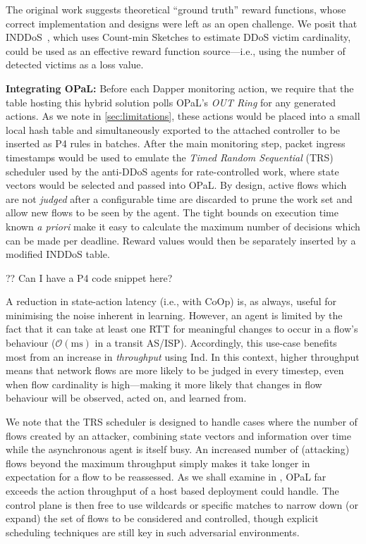 \documentclass[sigconf,natbib=false]{acmart}
\newcommand{\fakepara}[1]{\noindent\textbf{#1:}}
\newcommand{\approachshort}{OPaL}
\newcommand{\Coopfw}{CoOp}
\newcommand{\Indfw}{Ind}
\begin{document}
The original work suggests theoretical ``ground truth'' reward functions, whose correct implementation and designs were left as an open challenge. 
We posit that INDDoS~\parencite{tnms-ddos-victim-ident}, which uses Count-min Sketches to estimate DDoS victim cardinality, could be used as an effective reward function source---i.e., using the number of detected victims as a loss value.

\fakepara{Integrating \approachshort}
Before each Dapper monitoring action, we require that the table hosting this hybrid solution polls \approachshort{}'s \emph{OUT Ring} for any generated actions.
As we note in \cref{sec:limitations}, these actions would be placed into a small local hash table and simultaneously exported to the attached controller to be inserted as P4 rules in batches.
After the main monitoring step, packet ingress timestamps would be used to emulate the \emph{Timed Random Sequential} (TRS) scheduler used by the anti-DDoS agents for rate-controlled work, where state vectors would be selected and passed into \approachshort.
By design, active flows which are not \emph{judged} after a configurable time are discarded to prune the work set and allow new flows to be seen by the agent.
The tight bounds on execution time known \emph{a priori} make it easy to calculate the maximum number of decisions which can be made per deadline.
Reward values would then be separately inserted by a modified INDDoS table.

?? Can I have a P4 code snippet here?

A reduction in state-action latency (i.e., with \Coopfw) is, as always, useful for minimising the noise inherent in learning.
However, an agent is limited by the fact that it can take at least one RTT for meaningful changes to occur in a flow's behaviour ($\mathcal{O}{\left(\si{\milli\second}\right)}$ in a transit AS/ISP).
Accordingly, this use-case benefits most from an increase in \emph{throughput} using \Indfw{}.
In this context, higher throughput means that network flows are more likely to be judged in every timestep, even when flow cardinality is high---making it more likely that changes in flow behaviour will be observed, acted on, and learned from.

We note that the TRS scheduler is designed to handle cases where the number of flows created by an attacker, combining state vectors and information over time while the asynchronous agent is itself busy.
An increased number of (attacking) flows beyond the maximum throughput simply makes it take longer in expectation for a flow to be reassessed.
As we shall examine in , \approachshort{} far exceeds the action throughput of a host based deployment could handle.
The control plane is then free to use wildcards or specific matches to narrow down (or expand) the set of flows to be considered and controlled, though explicit scheduling techniques are still key in such adversarial environments.
\end{document}
